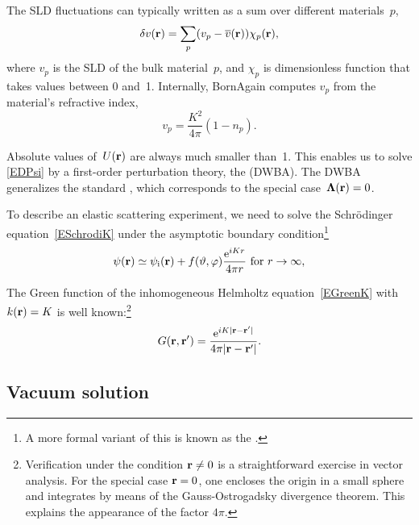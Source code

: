 The SLD fluctuations can typically written as a sum over different materials~$p$,
\begin{equation}
  \delta v(\mathbf{r}) = \sum_p (v_p-\overline{v}(\mathbf{r})) \chi_p(\mathbf{r}),
\end{equation}
where $v_p$ is the SLD of the bulk material~$p$,
and $\chi_p$ is dimensionless function that takes values between 0 and~1.
Internally, BornAgain computes $v_p$ from the material's refractive index,
\begin{equation}
  v_p = \frac{K^2}{4\pi}(1-n_p).
\end{equation}

Absolute values of~$U(\mathbf{r})$ are always much smaller than~1.
This enables us to solve \cref{EDPsi} by a first-order perturbation theory,
%
the  (DWBA).
%
The DWBA generalizes the standard ,
%
which corresponds to the special case~$\mathbf{\Lambda}(\mathbf{r})=0$.

To describe an elastic scattering experiment,
we need to solve the Schrödinger equation~\cref{ESchrodiK}
under the asymptotic boundary condition\footnote
{A more formal variant of this is known as the .%
%
%
}
%
\begin{equation}%
  \psi(\r)
  \simeq \psi_\si(\r) + f(\vartheta,\varphi)\frac{\e^{iKr}}{4\pi r}
  \text{~for~}r\to\infty,
\end{equation}

The Green function of the inhomogeneous Helmholtz equation~\cref{EGreenK}
with $k(\mathbf{r})=K$ is well known:\footnote
{Verification under the condition $\mathbf{r}\ne0$
is a straightforward exercise in vector analysis.
For the special case $\mathbf{r}=0$,
one encloses the origin in a small sphere
and integrates by means of the Gauss-Ostrogadsky divergence theorem.
This explains the appearance of the factor $4\pi$.}
%
\begin{equation}%
  G(\r,\r') = \frac{\e^{iK|\r-\r'|}}{4\pi |\r-\r'|}.
\end{equation}

\subsection{Vacuum solution}%

